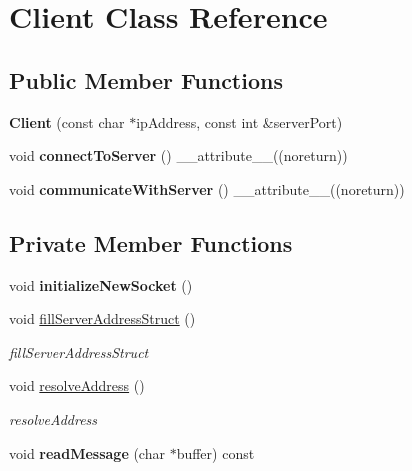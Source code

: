 \hypertarget{classClient}{}\section{Client Class Reference}
\label{classClient}
\subsection*{Public Member Functions}
\begin{DoxyCompactItemize}
\item 
\mbox{\label{classClient_a738a9f6805537f970f169c64a9df9ee1}} 
{\bfseries Client} (const char $\ast$ip\+Address, const int \&server\+Port)
\item 
\mbox{\label{classClient_ababa365ecacedad2a111016ed4e498c7}} 
void {\bfseries connect\+To\+Server} () \+\_\+\+\_\+attribute\+\_\+\+\_\+((noreturn))
\item 
\mbox{\label{classClient_aeada9cd75381f4036f8e0b7d8a717939}} 
void {\bfseries communicate\+With\+Server} () \+\_\+\+\_\+attribute\+\_\+\+\_\+((noreturn))
\end{DoxyCompactItemize}
\subsection*{Private Member Functions}
\begin{DoxyCompactItemize}
\item 
\mbox{\label{classClient_af17f9a911bfacf3ddfba5f3263a4c36a}} 
void {\bfseries initialize\+New\+Socket} ()
\item 
void \hyperlink{classClient_a214cdda23175ba7cc4f94037730cbfd4}{fill\+Server\+Address\+Struct} ()
\begin{DoxyCompactList}\small\item\em fill\+Server\+Address\+Struct \end{DoxyCompactList}\item 
void \hyperlink{classClient_a68e3bdb6ca10ee50268f219d58b6a3e3}{resolve\+Address} ()
\begin{DoxyCompactList}\small\item\em resolve\+Address \end{DoxyCompactList}\item 
\mbox{\label{classClient_aef8421b20a32263125e44387405b7aef}} 
void {\bfseries read\+Message} (char $\ast$buffer) const
\end{DoxyCompactItemize}
